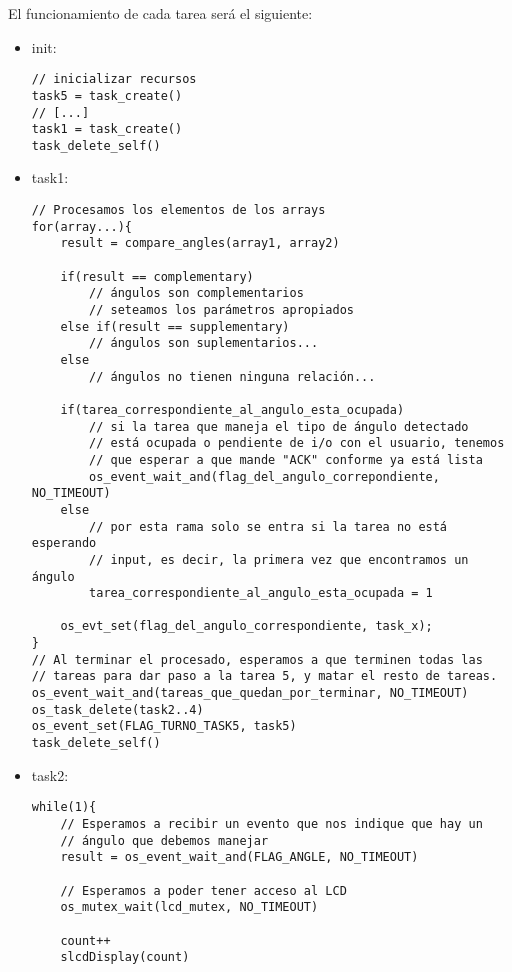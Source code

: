 \documentclass[a4paper,openright,12pt]{article}
\begin{document}
El funcionamiento de cada tarea será el siguiente:
\begin{itemize}
    \item init:
    \begin{samepage}    
    \begin{verbatim}
// inicializar recursos
task5 = task_create()
// [...]
task1 = task_create()
task_delete_self()
    \end{verbatim}
    \end{samepage}
    \item task1:   
    \begin{verbatim}
// Procesamos los elementos de los arrays
for(array...){
    result = compare_angles(array1, array2)

    if(result == complementary)
        // ángulos son complementarios
        // seteamos los parámetros apropiados
    else if(result == supplementary)
        // ángulos son suplementarios...
    else
        // ángulos no tienen ninguna relación...
    
    if(tarea_correspondiente_al_angulo_esta_ocupada)
        // si la tarea que maneja el tipo de ángulo detectado
        // está ocupada o pendiente de i/o con el usuario, tenemos
        // que esperar a que mande "ACK" conforme ya está lista
        os_event_wait_and(flag_del_angulo_correpondiente, NO_TIMEOUT)
    else
        // por esta rama solo se entra si la tarea no está esperando
        // input, es decir, la primera vez que encontramos un ángulo
        tarea_correspondiente_al_angulo_esta_ocupada = 1

    os_evt_set(flag_del_angulo_correspondiente, task_x);
}
// Al terminar el procesado, esperamos a que terminen todas las
// tareas para dar paso a la tarea 5, y matar el resto de tareas.
os_event_wait_and(tareas_que_quedan_por_terminar, NO_TIMEOUT)
os_task_delete(task2..4)
os_event_set(FLAG_TURNO_TASK5, task5)
task_delete_self()
    \end{verbatim}
    \item task2:
    \begin{samepage}    
    \begin{verbatim}
while(1){
    // Esperamos a recibir un evento que nos indique que hay un
    // ángulo que debemos manejar
    result = os_event_wait_and(FLAG_ANGLE, NO_TIMEOUT)
    
    // Esperamos a poder tener acceso al LCD
    os_mutex_wait(lcd_mutex, NO_TIMEOUT)

    count++
    slcdDisplay(count)


\end{verbatim}
\end{samepage}
\end{itemize}
\end{document}
